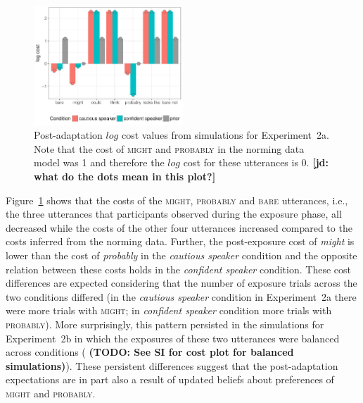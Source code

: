 \documentclass[man, floatsintext]{apa6}
\newcommand{\jd}[1]{\textcolor{PinkyPurple}{\textbf{[jd: #1]}}}
\newcommand{\todo}[1]{}
\renewcommand{\todo}[1]{{\bf \color{red} (TODO: {#1})}}
\begin{document}
\begin{figure}
\center
  \includegraphics[width=0.5\textwidth]{plots/adaptation-posterior-costs.pdf}
  \caption{Post-adaptation $log$ cost values from simulations for Experiment~2a. Note that the cost of \textsc{might} and \textsc{probably} 
  in the norming data model was 1 and therefore the $log$ cost for these utterances is 0. \jd{what do the dots mean in this plot?} \label{fig:post-exposure-costs}}
\end{figure}

Figure~\ref{fig:post-exposure-costs} shows that the costs of the \textsc{might}, \textsc{probably} and
\textsc{bare} utterances, i.e., the three utterances that participants observed during the exposure phase,
all decreased while the costs of the other four utterances increased compared to the costs inferred from the norming
data. Further, the post-exposure cost of \textit{might} is lower than the cost of \textit{probably} in the \textit{cautious speaker} condition
and the opposite relation between these costs holds in the \textit{confident speaker} condition. These cost differences
are expected considering that the number of exposure trials across the two conditions differed (in the \textit{cautious speaker} condition in Experiment~2a there were more trials
with \textsc{might}; in \textit{confident speaker} condition more trials with \textsc{probably}). More surprisingly, this pattern
persisted in the simulations for Experiment~2b in which the exposures of these two utterances were balanced across conditions 
(\todo{See SI for cost plot for balanced simulations}).
These persistent differences suggest that the post-adaptation expectations 
are in part also a result of updated beliefs about preferences of \textsc{might} and \textsc{probably}. 

%
\end{document}

